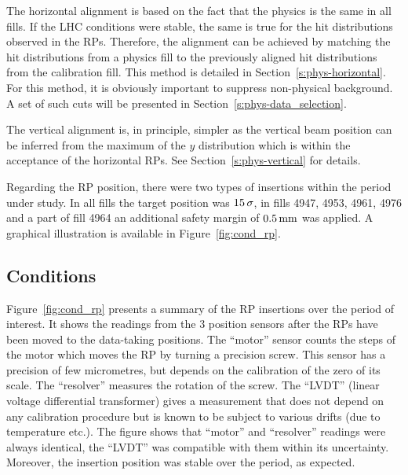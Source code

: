 \documentclass[TOTEM]{cern/cernphprep}
\def\un#1{\,{\rm #1}}
\begin{document}
The horizontal alignment is based on the fact that the physics is the same in all fills. If the LHC conditions were stable, the same is true for the hit distributions observed in the RPs. Therefore, the alignment can be achieved by matching the hit distributions from a physics fill to the previously aligned hit distributions from the calibration fill. This method is detailed in Section~\ref{s:phys-horizontal}. For this method, it is obviously important to suppress non-physical background. A set of such cuts will be presented in Section~\ref{s:phys-data_selection}.

The vertical alignment is, in principle, simpler as the vertical beam position can be inferred from the maximum of the $y$ distribution which is within the acceptance of the horizontal RPs. See Section~\ref{s:phys-vertical} for details.

Regarding the RP position, there were two types of insertions within the period under study. In all fills the target position was $15\un{\sigma}$, in fills 4947, 4953, 4961, 4976 and a part of fill 4964 an additional safety margin of $0.5\un{mm}$ was applied. A graphical illustration is available in Figure~\ref{fig:cond_rp}.

\subsection{Conditions}
\label{s:phys-conditions}

Figure~\ref{fig:cond_rp} presents a summary of the RP insertions over the period of interest. It shows the readings from the 3 position sensors after the RPs have been moved to the data-taking positions. The ``motor'' sensor counts the steps of the motor which moves the RP by turning a precision screw. This sensor has a precision of few micrometres, but depends on the calibration of the zero of its scale. The ``resolver'' measures the rotation of the screw. The ``LVDT'' (linear voltage differential transformer) gives a measurement that does not depend on any calibration procedure but is known to be subject to various drifts (due to temperature etc.). The figure shows that ``motor'' and ``resolver'' readings were always identical, the ``LVDT'' was compatible with them within its uncertainty. Moreover, the insertion position was stable over the period, as expected.
\end{document}
